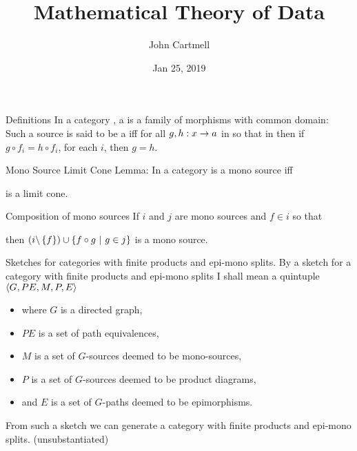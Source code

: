 \documentclass[xcolor=pst,dvips]{beamer}
\title[John Cartmell]{Mathematical Theory of Data}
\author{John Cartmell}
\institute{ad otium}
\date{Jan 25, 2019}
\begin{document}
\section{\MToDsection}
\subsection{\MToDsubsectionliteraturewithProductsandEpiMonosCategories}


\begin{frame}{Definitions} 
In a category \catc, a   is a family of morphisms with common domain: \\
\medskip
Such a source is said to be a   iff for all $g,h:x \rightarrow a$ in \catcw 
so that  
in \catcw then if $g \circ f_i = h \circ f_i$, for each $i$,  then $g=h$.
\end{frame}


\begin{frame}{Mono Source Limit Cone}  %
Lemma: In a category 
\scalebox{0.65}{

} is a mono source iff \\
\begin{center}
\scalebox{0.65}{

} 
is a limit cone.
\end{center}
\end{frame}




\begin{frame}{Composition of mono sources}
If $i$ and $j$ are mono sources and $f \in i$ so that
\begin{center}
\scalebox{0.65}{

}
\end{center}
then $(i \backslash \left\{f\right\}) \cup \left\{f \circ g \ \middle|\ g \in j\right\}$ is a mono source.
\end{frame}

\begin{frame}{Sketches for categories with finite products and epi-mono splits.}
By a sketch for a category with finite products and epi-mono splits I shall mean a quintuple
$\langle G,PE,M,P,E\rangle$
\begin{itemize}
\item  where $G$ is a directed graph, 
\item  $PE$ is a set of path equivalences, 
\item  $M$ is a set of $G$-sources deemed to be mono-sources,
\item  $P$ is a set of $G$-sources deemed to be product diagrams, 
\item  and $E$ is a set of $G$-paths deemed to be epimorphisms.
\end{itemize}
\medskip
From such a sketch we can generate a category with finite products and epi-mono splits.  \pause (unsubstantiated)   
\end{frame}
\end{document}
